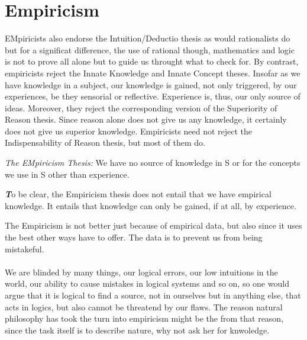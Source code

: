 \documentclass[10pt,a4paper]{article}
\newenvironment{callout}
	{\begin{calloutbox}\color{charcoal}\textbf\textit}
	{\end{calloutbox}}
\begin{document}
            \section{Empiricism}
                EMpiricists also endorse the Intuition/Deductio thesis as would rationalists do but for a significat difference, the use of rational though, mathematics and logic is not to prove all alone but to guide us throught what to check for.  By contrast, empiricists reject the Innate Knowledge and Innate Concept theses. Insofar as we have knowledge in a subject, our knowledge is gained, not only triggered, by our experiences, be they sensorial or reflective. Experience is, thus, our only source of ideas. Moreover, they reject the corresponding version of the Superiority of Reason thesis. Since reason alone does not give us any knowledge, it certainly does not give us superior knowledge. Empiricists need not reject the Indispensability of Reason thesis, but most of them do.\cite{sep-rationalism-empiricism}
                \begin{define}
                    \textit{The EMpiricism Thesis: } We have no source of knowledge in S or for the concepts we use in S other than experience.
                \end{define}
                \begin{callout}
                    To be clear, the Empiricism thesis does not entail that we have empirical knowledge. It entails that knowledge can only be gained, if at all, by experience.
                \end{callout}
                The Empiricism is not better just because of empirical data, but also since it uses the best other ways have to offer. The data is to prevent us from being mistakeful. 
                \\
                \\
                We are blinded by many things, our logical errors, our low intuitions in the world, our ability to cause mistakes in logical systems and so on, so one would argue that it is logical to find a source, not in ourselves but in anything else, that acts in logics, but also cannot be threatend by our flaws. The reason natural philosophy has took the turn into empiricism might be the from that reason, since the task itself is to describe nature, why not ask her for knwoledge.
                \\
                \\
\end{document}

